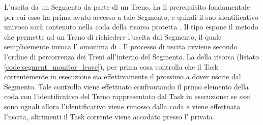 	L'uscita da un Segmento da parte di un Treno, ha il prerequisito fondamentale per cui esso ha prima avuto accesso a tale Segmento, e quindi il suo identificativo univoco sarà contenuto nella coda  della risorsa protetta .
	Il tipo   espone il metodo  che permette ad un Treno di richiedere l'uscita dal Segmento, il quale semplicemente invoca l' omonima di .
	Il processo di uscita avviene secondo l'ordine di percorrenza dei Treni all'interno del Segmento.	
	La   della risorsa  (listato \ref{code:segment_monitor_leave}), per prima cosa controlla che il Task correntemente in esecuzione sia effettivamente il prossimo a dover uscire dal Segmento. Tale controllo viene effettuato confrontando il primo elemento della coda  con l'identificativo del Treno rappresentato dal Task in esecuzione: se essi sono uguali allora l'identificativo viene rimosso dalla coda e viene effettuata l'uscita, altrimenti il Task corrente viene accodato presso l' privata .
	
